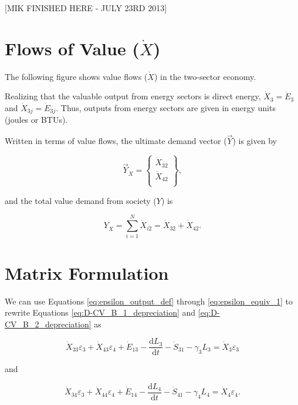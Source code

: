 [MIK FINISHED HERE - JULY 23RD 2013]

\section{Flows of Value ($\dot{X}$)}

The following figure shows value flows ($\dot{X}$) in the two-sector economy.

Realizing that the valuable output from energy sectors is direct energy, $\dot{X}_{3} = \dot{E}_{3}$ and $\dot{X}_{3j} = \dot{E}_{3j}$. Thus, outputs from energy sectors are given in energy units (joules or BTUs). 

Written in terms of value flows, the ultimate demand vector ($\vec{Y}$) is given by

\begin{equation} \label{eq:D-demand_vector_B_dot}
	\vec{Y}_{\dot{X}} = 	\begin{Bmatrix} 	\dot{X}_{32}	\\
																\dot{X}_{42}	\\
									\end{Bmatrix},
\end{equation}

\noindent and the total value demand from society ($Y$) is 

\begin{equation} \label{eq:D-total_value_demand}
	Y_{\dot{X}} = \sum_{i=1}^{N} \dot{X}_{i2} = \dot{X}_{32} + \dot{X}_{42}.
	\end{equation}

\section{Matrix Formulation}

We can use Equations \ref{eq:epsilon_output_def} through \ref{eq:epsilon_equiv_1} to rewrite Equations \ref{eq:D-CV_B_1_depreciation} and \ref{eq:D-CV_B_2_depreciation} as

\begin{equation} \label{eq:D-CV_B_3_with_eps}
	\dot{X}_{33}\varepsilon_{3} + \dot{X}_{43}\varepsilon_{4} + \dot{E}_{13} - \frac{\mathrm{d}L_{3}}{\mathrm{d}t} - \dot{S}_{31} - \gamma_{3}L_{3} = \dot{X}_{3}\varepsilon_{3}
\end{equation}

\noindent and 

\begin{equation} \label{eq:D-CV_B_4_with_eps}
	\dot{X}_{34}\varepsilon_{3} + \dot{X}_{44}\varepsilon_{4} + \dot{E}_{14} - \frac{\mathrm{d}L_{4}}{\mathrm{d}t} - \dot{S}_{41} - \gamma_{4}L_{4} = \dot{X}_{4}\varepsilon_{4}.
\end{equation}

